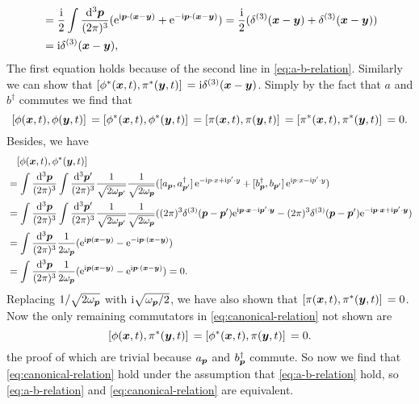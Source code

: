 \documentclass[hyperref, a4paper]{article}
\newcommand*{\ii}{\mathrm{i}}
\newcommand*{\ee}{\mathrm{e}}
\begin{document}
\begin{itemize}
\[\begin{aligned}
            &= \frac{\ii}{2} \int \frac{\dd[3]{\vb*{p}}}{(2\pi)^3} (\ee^{\ii \vb*{p} \cdot (\vb*{x} - \vb*{y})} + \ee^{- \ii \vb*{p} \cdot (\vb*{x} - \vb*{y})}) = \frac{\ii}{2} (\delta^{(3)}(\vb*{x} - \vb*{y}) + \delta^{(3)}(\vb*{x} - \vb*{y})) \\
            &= \ii \delta^{(3)}(\vb*{x} - \vb*{y}),
        \end{aligned}
    \]
    The first equation holds because of the second line in \eqref{eq:a-b-relation}.
    Similarly we can show that $\comm*{\phi^*(\vb*{x}, t)}{\pi^*(\vb*{y}, t)} = \ii \delta^{(3)}(\vb*{x} - \vb*{y})$.
    Simply by the fact that $a$ and $b^\dagger$ commutes we find that 
    \[
        \comm*{\phi(\vb*{x}, t)}{\phi(\vb*{y}, t)} = \comm*{\phi^*(\vb*{x}, t)}{\phi^*(\vb*{y}, t)} = \comm*{\pi(\vb*{x}, t)}{\pi(\vb*{y}, t)} = \comm*{\pi^*(\vb*{x}, t)}{\pi^*(\vb*{y}, t)}  = 0.
    \]
    Besides, we have 
    \[
        \begin{aligned}
            &\quad \comm*{\phi(\vb*{x}, t)}{\phi^*(\vb*{y}, t)} \\
            &=  \int \frac{\dd[3]{\vb*{p}}}{(2\pi)^3} \int \frac{\dd[3]{\vb*{p}'}}{(2\pi)^3} \frac{1}{\sqrt{2\omega_{\vb*{p}'}}} \frac{1}{\sqrt{2 \omega_{\vb*{p}}}} (\comm*{a_{\vb*{p}}}{a^\dagger_{\vb*{p}'}} \ee^{- \ii p \cdot x + \ii p' \cdot y} + \comm*{b^\dagger_{\vb*{p}}}{b_{\vb*{p}'}} \ee^{\ii p \cdot x- \ii p' \cdot y})  \\
            &= \int \frac{\dd[3]{\vb*{p}}}{(2\pi)^3} \int \frac{\dd[3]{\vb*{p}'}}{(2\pi)^3} \frac{1}{\sqrt{2\omega_{\vb*{p}'}}} \frac{1}{\sqrt{2 \omega_{\vb*{p}}}} ( (2\pi)^3 \delta^{(3)}(\vb*{p} - \vb*{p}') \ee^{\ii \vb*{p} \cdot \vb*{x} - \ii \vb*{p}' \cdot \vb*{y}} - (2\pi)^3 \delta^{(3)}(\vb*{p} - \vb*{p}') \ee^{- \ii \vb*{p} \cdot \vb*{x} + \ii \vb*{p}' \cdot \vb*{y}}) \\
            &=  \int \frac{\dd[3]{\vb*{p}}}{(2\pi)^3}  \frac{1}{2 \omega_{\vb*{p}}} (\ee^{\ii \vb*{p} (\vb*{x} - \vb*{y})} - \ee^{- \ii \vb*{p} \cdot (\vb*{x} - \vb*{y})}) \\
            &=  \int \frac{\dd[3]{\vb*{p}}}{(2\pi)^3}  \frac{1}{2 \omega_{\vb*{p}}} (\ee^{\ii \vb*{p} (\vb*{x} - \vb*{y})} - \ee^{\ii \vb*{p} \cdot (\vb*{x} - \vb*{y})}) = 0.
        \end{aligned}
    \]
    Replacing $1 / \sqrt{2 \omega_{\vb*{p}}}$ with $\ii \sqrt{\omega_{\vb*{p}} / 2}$, we have also shown that $\comm*{\pi(\vb*{x}, t)}{\pi^*(\vb*{y} ,t)} = 0$.
    Now the only remaining commutators in \eqref{eq:canonical-relation} not shown are 
    \[
        \comm*{\phi(\vb*{x}, t)}{\pi^*(\vb*{y}, t)} = \comm*{\phi^*(\vb*{x}, t)}{\pi(\vb*{y}, t)} = 0.
    \]
    the proof of which are trivial because $a_{\vb*{p}}$ and $b^\dagger_{\vb*{p}}$ commute.
    So now we find that \eqref{eq:canonical-relation} hold under the assumption that \eqref{eq:a-b-relation} hold, so \eqref{eq:a-b-relation} and \eqref{eq:canonical-relation} are equivalent.


\end{itemize}
\end{document}
